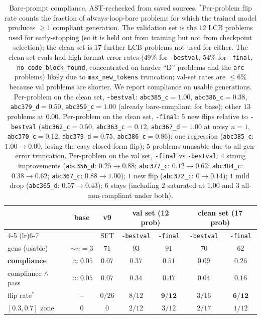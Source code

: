 \documentclass[11pt]{article}
\begin{document}
\begin{table}[h]
\centering
\small
\setlength{\tabcolsep}{3.5pt}
\begin{tabular}{lcccccc}
\toprule
& base & v9 & \multicolumn{2}{c}{val set (12 prob)} & \multicolumn{2}{c}{clean set (17 prob)} \\
\cmidrule(lr){4-5} \cmidrule(lr){6-7}
& & SFT & \texttt{-bestval} & \texttt{-final} & \texttt{-bestval} & \texttt{-final} \\
\midrule
gens (usable) & $\sim n{=}3$ & $71$ & $93$ & $91$ & $70$ & $62$ \\
\textbf{compliance} & $\approx 0.05$ & $0.07$ & $\mathbf{0.37}$ & $\mathbf{0.51}$ & $0.09$ & $\mathbf{0.26}$ \\
compliance $\wedge$ pass & $\approx 0.05$ & $0.07$ & $0.34$ & $\mathbf{0.47}$ & $0.04$ & $\mathbf{0.16}$ \\
flip rate$^{*}$ & $-$ & $0/26$ & $8/12$ & $\mathbf{9/12}$ & $3/16$ & $\mathbf{6/12}$ \\
$[0.3, 0.7]$ zone & $0$ & $0$ & $2/12$ & $3/12$ & $2/17$ & $1/12$ \\
\bottomrule
\end{tabular}
\caption{Bare-prompt compliance, AST-rechecked from saved sources. $^{*}$Per-problem flip rate counts the fraction of always-loop-bare problems for which the trained model produces $\ge 1$ compliant generation. The validation set is the $12$ LCB problems used for early-stopping (so it is held out from training but not from checkpoint selection); the clean set is $17$ further LCB problems not used for either. The clean-set evals had high format-error rates ($49\%$ for \texttt{-bestval}, $54\%$ for \texttt{-final}, \texttt{no\_code\_block\_found}, concentrated on harder ``D'' problems and the \texttt{arc} problems) likely due to \texttt{max\_new\_tokens} truncation; val-set rates are $\le 6\%$ because val problems are shorter. We report compliance on usable generations. Per-problem on the clean set, \texttt{-bestval}: \texttt{abc385\_c}$=1.00$, \texttt{abc386\_c}$=0.38$, \texttt{abc379\_d}$=0.50$, \texttt{abc359\_c}$=1.00$ (already bare-compliant for base); other $13$ problems at $0.00$. Per-problem on the clean set, \texttt{-final}: $5$ new flips relative to \texttt{-bestval} (\texttt{abc362\_c}$=0.50$, \texttt{abc363\_c}$=0.12$, \texttt{abc367\_d}$=1.00$ at noisy $n{=}1$, \texttt{abc370\_c}$=0.12$, \texttt{abc379\_d}$=0.75$, \texttt{abc386\_c}$=0.86$); one regression (\texttt{abc385\_c}: $1.00\!\to\!0.00$, losing the easy closed-form flip); $5$ problems unusable due to all-gen-error truncation. Per-problem on the val set, \texttt{-final} vs \texttt{-bestval}: $4$ strong improvements (\texttt{abc356\_d}: $0.25\!\to\!0.88$; \texttt{abc377\_c}: $0.12\!\to\!0.62$; \texttt{abc384\_c}: $0.38\!\to\!0.62$; \texttt{abc367\_c}: $0.88\!\to\!1.00$); $1$ new flip (\texttt{abc372\_c}: $0\!\to\!0.14$); $1$ mild drop (\texttt{abc365\_d}: $0.57\!\to\!0.43$); $6$ stays (including $2$ saturated at $1.00$ and $3$ all-non-compliant under both).}
\label{tab:sft}
\end{table}
\end{document}

